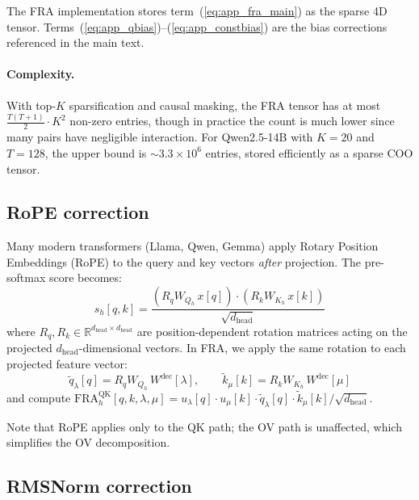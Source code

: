 \documentclass{article}
\theoremstyle{plain}
\theoremstyle{definition}
\theoremstyle{remark}
\newcommand{\Wdec}{W^{\mathrm{dec}}}
\newcommand{\dhead}{d_{\mathrm{head}}}
\newcommand{\ulambda}{u_\lambda}
\newcommand{\umu}{u_\mu}
\newcommand{\RR}{\mathbb{R}}
\begin{document}
The FRA implementation stores term~(\ref{eq:app_fra_main}) as the sparse 4D tensor. Terms~(\ref{eq:app_qbias})--(\ref{eq:app_constbias}) are the bias corrections referenced in the main text.

\paragraph{Complexity.} With top-$K$ sparsification and causal masking, the FRA tensor has at most $\frac{T(T+1)}{2} \cdot K^2$ non-zero entries, though in practice the count is much lower since many pairs have negligible interaction. For Qwen2.5-14B with $K{=}20$ and $T{=}128$, the upper bound is ${\sim}3.3 \times 10^6$ entries, stored efficiently as a sparse COO tensor.

\subsection{RoPE correction}
\label{app:rope}

Many modern transformers (Llama, Qwen, Gemma) apply Rotary Position Embeddings (RoPE) to the query and key vectors \emph{after} projection. The pre-softmax score becomes:
\begin{equation}
    s_h[q,k] = \frac{\left(R_q W_{Q_h}\,x[q] \right) \cdot \left( R_k W_{K_h}\,x[k] \right)}{\sqrt{\dhead}}
\end{equation}
where $R_q, R_k \in \RR^{\dhead \times \dhead}$ are position-dependent rotation matrices acting on the projected $\dhead$-dimensional vectors. In FRA, we apply the same rotation to each projected feature vector:
\begin{equation}
    \tilde{q}_\lambda[q] = R_q W_{Q_h}\,\Wdec[\lambda], \qquad \tilde{k}_\mu[k] = R_k W_{K_h}\,\Wdec[\mu]
\end{equation}
and compute $\mathrm{FRA}^{\mathrm{QK}}_h[q,k,\lambda,\mu] = \ulambda[q] \cdot \umu[k] \cdot \tilde{q}_\lambda[q] \cdot \tilde{k}_\mu[k] / \sqrt{\dhead}$.

Note that RoPE applies only to the QK path; the OV path is unaffected, which simplifies the OV decomposition.

\subsection{RMSNorm correction}
\label{app:rms}
\end{document}
